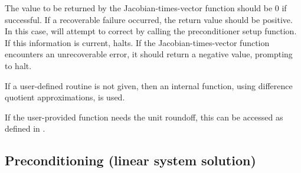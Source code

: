 {  
  The value to be returned by the Jacobian-times-vector function   should be
  $0$ if successful. If a recoverable failure occurred, the return
  value should be positive.  In this case, {\kinsol} will attempt to
  correct by calling the preconditioner setup function. If this
  information is current, {\kinsol} halts.  If the
  Jacobian-times-vector function encounters an unrecoverable error, it
  should return a negative value, prompting {\kinsol} to halt.  } { If
  a user-defined routine is not given, then an internal {\kinspgmr}
  function, using difference quotient approximations, is used.

  If the user-provided  function needs the unit roundoff,
  this can be accessed as  defined in .
}

\subsection{Preconditioning (linear system solution)} \label{ss:psolveFn}

